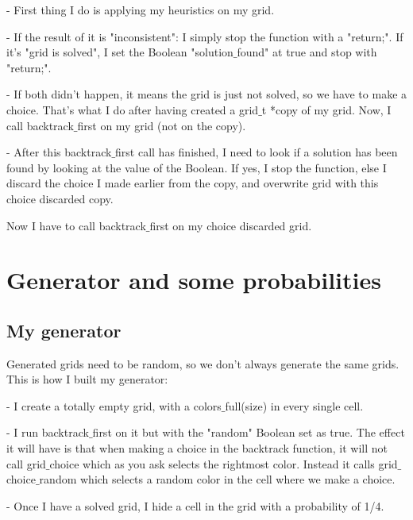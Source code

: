 \documentclass{article}
\begin{document}
\vspace{1\baselineskip}
- First thing I do is  applying my heuristics on my grid.

\vspace{1\baselineskip}
- If the result of it is "inconsistent": I simply stop the function with a "return;". If it's "grid is solved", I set the Boolean "solution$\_$found" at true and stop with "return;".

\vspace{1\baselineskip}
- If both didn't happen, it means the grid is just not solved, so we have to make a choice. That's what I do after having created a grid$\_$t *copy of my grid. Now, I call backtrack$\_$first on my grid (not on the copy).

\vspace{1\baselineskip}
- After this backtrack$\_$first call has finished, I need to look if a solution has been found by looking at the value of the Boolean. If yes, I stop the function, else I discard the choice I made earlier from the copy, and overwrite grid with this choice discarded copy.

Now I have to call backtrack$\_$first on my choice discarded grid.

\section{Generator and some probabilities}

\subsection{My generator}

Generated grids need to be random, so we don't always generate the same grids. This is how I built my generator:

\vspace{1\baselineskip}
 - I create a totally empty grid, with a colors$\_$full(size) in every single cell.

\vspace{1\baselineskip}
 - I run backtrack$\_$first on it but with the "random" Boolean set as true. The effect it will have is that when making a choice in the backtrack function, it will not call grid$\_$choice which as you ask selects the rightmost color. Instead it calls grid$\_$choice$\_$random which selects a random color in the cell where we make a choice.

\vspace{1\baselineskip}
 - Once I have a solved grid, I hide a cell in the grid with a probability of 1/4. 
\end{document}
